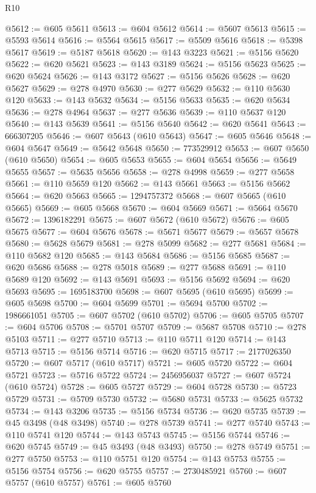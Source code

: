 \begin{lexlean}{R10}
\begin{coremodule}
@5612 := @605 @5611
@5613 := @604 @5612
@5614 := @5607 @5613
@5615 := @5593 @5614
@5616 := @5564 @5615
@5617 := @5509 @5616
@5618 := @5398 @5617
@5619 := @5187 @5618
@5620 := @143 @3223
@5621 := @5156 @5620
@5622 := @620 @5621
@5623 := @143 @3189
@5624 := @5156 @5623
@5625 := @620 @5624
@5626 := @143 @3172
@5627 := @5156 @5626
@5628 := @620 @5627
@5629 := @278 @4970
@5630 := @277 @5629
@5632 := @110 @5630 @120
@5633 := @143 @5632
@5634 := @5156 @5633
@5635 := @620 @5634
@5636 := @278 @4964
@5637 := @277 @5636
@5639 := @110 @5637 @120
@5640 := @143 @5639
@5641 := @5156 @5640
@5642 := @620 @5641
@5643 := 666307205
@5646 := @607 @5643 (@610 @5643)
@5647 := @605 @5646
@5648 := @604 @5647
@5649 := @5642 @5648
@5650 := 773529912
@5653 := @607 @5650 (@610 @5650)
@5654 := @605 @5653
@5655 := @604 @5654
@5656 := @5649 @5655
@5657 := @5635 @5656
@5658 := @278 @4998
@5659 := @277 @5658
@5661 := @110 @5659 @120
@5662 := @143 @5661
@5663 := @5156 @5662
@5664 := @620 @5663
@5665 := 1294757372
@5668 := @607 @5665 (@610 @5665)
@5669 := @605 @5668
@5670 := @604 @5669
@5671 := @5664 @5670
@5672 := 1396182291
@5675 := @607 @5672 (@610 @5672)
@5676 := @605 @5675
@5677 := @604 @5676
@5678 := @5671 @5677
@5679 := @5657 @5678
@5680 := @5628 @5679
@5681 := @278 @5099
@5682 := @277 @5681
@5684 := @110 @5682 @120
@5685 := @143 @5684
@5686 := @5156 @5685
@5687 := @620 @5686
@5688 := @278 @5018
@5689 := @277 @5688
@5691 := @110 @5689 @120
@5692 := @143 @5691
@5693 := @5156 @5692
@5694 := @620 @5693
@5695 := 1695183700
@5698 := @607 @5695 (@610 @5695)
@5699 := @605 @5698
@5700 := @604 @5699
@5701 := @5694 @5700
@5702 := 1986661051
@5705 := @607 @5702 (@610 @5702)
@5706 := @605 @5705
@5707 := @604 @5706
@5708 := @5701 @5707
@5709 := @5687 @5708
@5710 := @278 @5103
@5711 := @277 @5710
@5713 := @110 @5711 @120
@5714 := @143 @5713
@5715 := @5156 @5714
@5716 := @620 @5715
@5717 := 2177026350
@5720 := @607 @5717 (@610 @5717)
@5721 := @605 @5720
@5722 := @604 @5721
@5723 := @5716 @5722
@5724 := 2456956037
@5727 := @607 @5724 (@610 @5724)
@5728 := @605 @5727
@5729 := @604 @5728
@5730 := @5723 @5729
@5731 := @5709 @5730
@5732 := @5680 @5731
@5733 := @5625 @5732
@5734 := @143 @3206
@5735 := @5156 @5734
@5736 := @620 @5735
@5739 := @45 @3498 (@48 @3498)
@5740 := @278 @5739
@5741 := @277 @5740
@5743 := @110 @5741 @120
@5744 := @143 @5743
@5745 := @5156 @5744
@5746 := @620 @5745
@5749 := @45 @3493 (@48 @3493)
@5750 := @278 @5749
@5751 := @277 @5750
@5753 := @110 @5751 @120
@5754 := @143 @5753
@5755 := @5156 @5754
@5756 := @620 @5755
@5757 := 2730485921
@5760 := @607 @5757 (@610 @5757)
@5761 := @605 @5760

\end{coremodule}
\end{lexlean}
